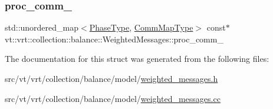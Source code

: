 \mbox{\label{structvt_1_1vrt_1_1collection_1_1balance_1_1_weighted_messages_a00eed5357188d150d0726e98b683711e}} 
\subsubsection{\texorpdfstring{proc\+\_\+comm\+\_\+}{proc\_comm\_}}
{\footnotesize\ttfamily std\+::unordered\+\_\+map$<$\hyperlink{namespacevt_a46ce6733d5cdbd735d561b7b4029f6d7}{Phase\+Type}, \hyperlink{namespacevt_1_1vrt_1_1collection_1_1balance_a01ee1fb0ae2da1d2ab7fdca3be9ae351}{Comm\+Map\+Type}$>$ const$\ast$ vt\+::vrt\+::collection\+::balance\+::\+Weighted\+Messages\+::proc\+\_\+comm\+\_\+\hspace{0.3cm}{\ttfamily [private]}}



The documentation for this struct was generated from the following files\+:\begin{DoxyCompactItemize}
\item 
src/vt/vrt/collection/balance/model/\hyperlink{weighted__messages_8h}{weighted\+\_\+messages.\+h}\item 
src/vt/vrt/collection/balance/model/\hyperlink{weighted__messages_8cc}{weighted\+\_\+messages.\+cc}\end{DoxyCompactItemize}

